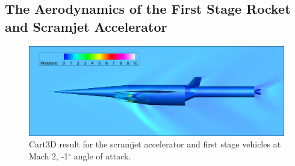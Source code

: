   \subsection{The Aerodynamics of the First Stage Rocket and Scramjet Accelerator}\label{sec:firststageaero}
  
  
  
  
   \begin{figure}[ht]
   	\centering
   	\includegraphics[width=0.8\linewidth]{figures/3_vehicle_design/CARTcontour}
   	\caption{Cart3D result for the scramjet accelerator and first stage vehicles at Mach 2, -1$^\circ$ angle of attack.}
   	\label{fig:CARTcontour}
   \end{figure}
   
